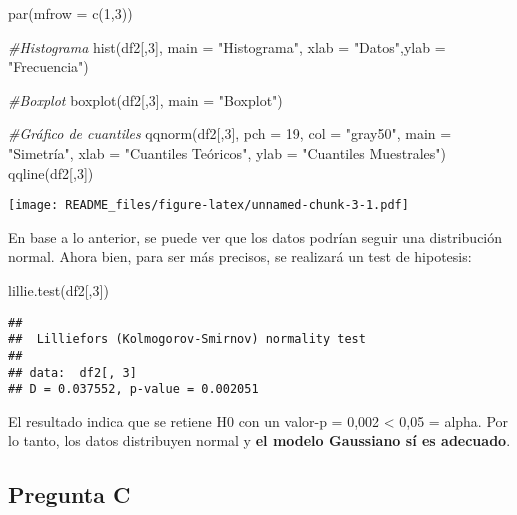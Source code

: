 \documentclass[
]{article}
\newenvironment{Shaded}{\begin{snugshade}}{\end{snugshade}}
\newcommand{\AttributeTok}[1]{\textcolor[rgb]{0.77,0.63,0.00}{#1}}
\newcommand{\CommentTok}[1]{\textcolor[rgb]{0.56,0.35,0.01}{\textit{#1}}}
\newcommand{\DecValTok}[1]{\textcolor[rgb]{0.00,0.00,0.81}{#1}}
\newcommand{\FunctionTok}[1]{\textcolor[rgb]{0.00,0.00,0.00}{#1}}
\newcommand{\NormalTok}[1]{#1}
\newcommand{\StringTok}[1]{\textcolor[rgb]{0.31,0.60,0.02}{#1}}
\begin{document}
\begin{Shaded}
\begin{Highlighting}[]
\FunctionTok{par}\NormalTok{(}\AttributeTok{mfrow =} \FunctionTok{c}\NormalTok{(}\DecValTok{1}\NormalTok{,}\DecValTok{3}\NormalTok{))}

\CommentTok{\#Histograma}
\FunctionTok{hist}\NormalTok{(df2[,}\DecValTok{3}\NormalTok{], }\AttributeTok{main =} \StringTok{"Histograma"}\NormalTok{, }\AttributeTok{xlab =} \StringTok{"Datos"}\NormalTok{,}\AttributeTok{ylab =} \StringTok{"Frecuencia"}\NormalTok{)}

\CommentTok{\#Boxplot}
\FunctionTok{boxplot}\NormalTok{(df2[,}\DecValTok{3}\NormalTok{], }\AttributeTok{main =} \StringTok{"Boxplot"}\NormalTok{)}

\CommentTok{\#Gráfico de cuantiles}
\FunctionTok{qqnorm}\NormalTok{(df2[,}\DecValTok{3}\NormalTok{], }\AttributeTok{pch =} \DecValTok{19}\NormalTok{, }\AttributeTok{col =} \StringTok{"gray50"}\NormalTok{, }\AttributeTok{main =} \StringTok{"Simetría"}\NormalTok{, }\AttributeTok{xlab =} \StringTok{"Cuantiles Teóricos"}\NormalTok{, }\AttributeTok{ylab =} \StringTok{"Cuantiles Muestrales"}\NormalTok{)}
\FunctionTok{qqline}\NormalTok{(df2[,}\DecValTok{3}\NormalTok{])}
\end{Highlighting}
\end{Shaded}

\texttt{[image: README\_files/figure-latex/unnamed-chunk-3-1.pdf]}

En base a lo anterior, se puede ver que los datos podrían seguir una
distribución normal. Ahora bien, para ser más precisos, se realizará un
test de hipotesis:

\begin{Shaded}
\begin{Highlighting}[]
\FunctionTok{lillie.test}\NormalTok{(df2[,}\DecValTok{3}\NormalTok{])}
\end{Highlighting}
\end{Shaded}

\begin{verbatim}
## 
##  Lilliefors (Kolmogorov-Smirnov) normality test
## 
## data:  df2[, 3]
## D = 0.037552, p-value = 0.002051
\end{verbatim}

El resultado indica que se retiene H0 con un valor-p = 0,002 \textless{}
0,05 = alpha. Por lo tanto, los datos distribuyen normal y \textbf{el
modelo Gaussiano sí es adecuado}.

\hypertarget{pregunta-c}{%
\subsection{Pregunta C}\label{pregunta-c}}
\end{document}
